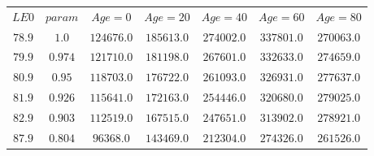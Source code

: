 \begin{tabular}{ccccccc}
$LE0$ & $param$ & $Age=0$ & $Age=20$ & $Age=40$ & $Age=60$ & $Age=80$\\
$78.9$ & $1.0$ & $124676.0$ & $185613.0$ & $274002.0$ & $337801.0$ & $270063.0$\\
$79.9$ & $0.974$ & $121710.0$ & $181198.0$ & $267601.0$ & $332633.0$ & $274659.0$\\
$80.9$ & $0.95$ & $118703.0$ & $176722.0$ & $261093.0$ & $326931.0$ & $277637.0$\\
$81.9$ & $0.926$ & $115641.0$ & $172163.0$ & $254446.0$ & $320680.0$ & $279025.0$\\
$82.9$ & $0.903$ & $112519.0$ & $167515.0$ & $247651.0$ & $313902.0$ & $278921.0$\\
$87.9$ & $0.804$ & $96368.0$ & $143469.0$ & $212304.0$ & $274326.0$ & $261526.0$\\
\end{tabular}

